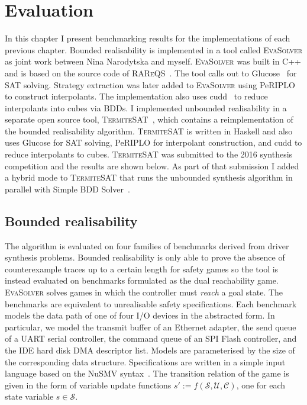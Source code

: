 \chapter{Evaluation}
\label{ch:evaluation}

\newcommand{\eva}[0]{\textsc{EvaSolver}\xspace}
\newcommand{\termitesat}[0]{\textsc{TermiteSAT}\xspace}
\newcommand{\ignore}[1]{}

In this chapter I present benchmarking results for the implementations of each previous chapter. Bounded realisability is implemented in a tool called \eva as joint work between Nina Narodytska and myself. \eva was built in C++ and is based on the source code of \textsc{RAReQS}~\cite{Janota12}. The tool calls out to Glucose~\cite{Audemard09} for SAT solving. Strategy extraction was later added to \eva using PeRIPLO~\cite{Rollini13} to construct interpolants. The implementation also uses cudd~\cite{Somenzi01} to reduce interpolants into cubes via BDDs. I implemented unbounded realisability in a separate open source tool, \termitesat~\cite{TermiteSAT}, which contains a reimplementation of the bounded realisability algorithm. \termitesat is written in Haskell and also uses Glucose for SAT solving, PeRIPLO for interpolant construction, and cudd to reduce interpolants to cubes. \termitesat was submitted to the 2016 synthesis competition and the results are shown below. As part of that submission I added a hybrid mode to \termitesat that runs the unbounded synthesis algorithm in parallel with Simple BDD Solver~\cite{Walker14b}.

\section{Bounded realisability}

The algorithm is evaluated on four families of benchmarks derived from driver synthesis problems. Bounded realisability is only able to prove the absence of counterexample traces up to a certain length for safety games so the tool is instead evaluated on benchmarks formulated as the dual reachability game. \eva solves games in which the controller must \emph{reach} a goal state. The benchmarks are equivalent to unrealisable safety specifications.  Each benchmark models the data path of one of four I/O devices in the abstracted form.  In particular, we model the transmit buffer of an Ethernet adapter, the send queue of a UART serial controller, the command queue of an SPI Flash controller, and the IDE hard disk DMA descriptor list.   Models are parameterised by the size of the corresponding data structure.  Specifications are written in a simple input language based on the NuSMV syntax~\cite{Henzinger03}.   The transition relation of the game is given in the form of variable update functions $s' := f(\mathcal{S}, \mathcal{U}, \mathcal{C})$, one for each state variable $s \in \mathcal{S}$.

